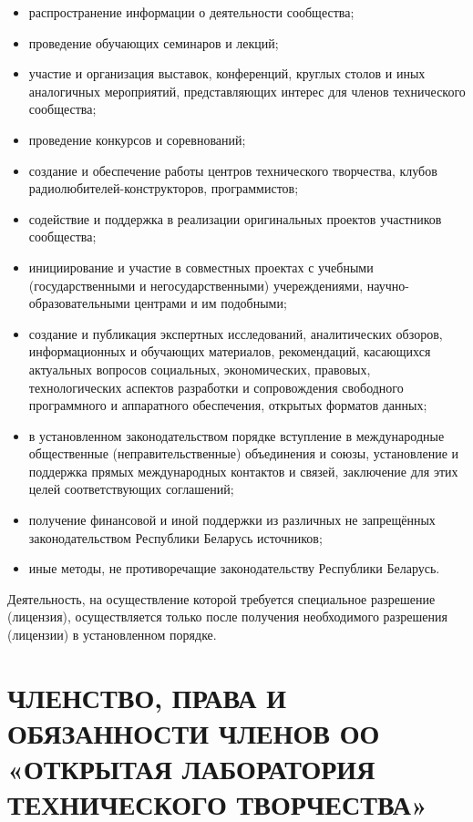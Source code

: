 \documentclass[a4paper,fontsize=14pt,titlepage]{scrartcl}
\makeatletter
\let\@@@section=\section
\renewcommand\section[1]{\@@@section{\MakeUppercase{#1}}}
\makeatother
\begin{document}
\begin{itemize}
\item распространение информации о деятельности сообщества;
\item проведение обучающих семинаров и лекций;
\item участие и организация выставок, конференций, круглых столов и иных аналогичных мероприятий, представляющих интерес для
членов технического сообщества;
\item проведение конкурсов и соревнований;
\item создание и обеспечение работы центров технического творчества, клубов радиолюбителей-конструкторов, программистов;
\item содействие и поддержка в реализации оригинальных проектов участников сообщества;
\item инициирование и участие в совместных проектах с учебными (государственными и негосударственными) учереждениями,
научно-образовательными центрами и им подобными;
\item создание и публикация экспертных исследований, аналитических обзоров,
информационных и обучающих материалов, рекомендаций, касающихся актуальных вопросов социальных,
экономических, правовых, технологических аспектов разработки и сопровождения свободного программного и аппаратного обеспечения,
открытых форматов данных;
\item в установленном законодательством порядке вступление в международные общественные (неправительственные) объединения и
союзы, установление и поддержка прямых международных контактов и связей, заключение для этих целей соответствующих
соглашений;
\item получение финансовой и иной поддержки из различных не запрещённых законодательством Республики Беларусь источников;
\item иные методы, не противоречащие законодательству Республики Беларусь.
\end{itemize}
Деятельность, на осуществление которой требуется специальное разрешение (лицензия),
осуществляется только после получения необходимого разрешения (лицензии) в установленном порядке.




\newpage\section{ЧЛЕНСТВО, ПРАВА И ОБЯЗАННОСТИ ЧЛЕНОВ ОО «Открытая лаборатория технического творчества»}
\end{document}
